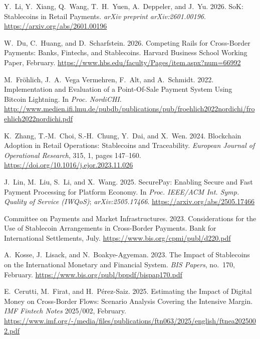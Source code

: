 \documentclass[12pt,a4paper]{report}
\begin{document}
{\begin{enumerate}[label={[\arabic*]}]
\item Y.~Li, Y.~Xiang, Q.~Wang, T.~H.~Yuen, A.~Deppeler, and J.~Yu. 2026. SoK: Stablecoins in Retail Payments. \emph{arXiv preprint arXiv:2601.00196}. \url{https://arxiv.org/abs/2601.00196}

\item W.~Du, C.~Huang, and D.~Scharfstein. 2026. Competing Rails for Cross-Border Payments: Banks, Fintechs, and Stablecoins. Harvard Business School Working Paper, February. \url{https://www.hbs.edu/faculty/Pages/item.aspx?num=66992}

\item M.~Fr\"{o}hlich, J.~A.~Vega Vermehren, F.~Alt, and A.~Schmidt. 2022. Implementation and Evaluation of a Point-Of-Sale Payment System Using Bitcoin Lightning. In \emph{Proc. NordiCHI}. \url{http://www.medien.ifi.lmu.de/pubdb/publications/pub/froehlich2022nordichi/froehlich2022nordichi.pdf}

\item K.~Zhang, T.-M.~Choi, S.-H.~Chung, Y.~Dai, and X.~Wen. 2024. Blockchain Adoption in Retail Operations: Stablecoins and Traceability. \emph{European Journal of Operational Research}, 315, 1, pages 147--160. \url{https://doi.org/10.1016/j.ejor.2023.11.026}

\item J.~Lin, M.~Liu, S.~Li, and X.~Wang. 2025. SecurePay: Enabling Secure and Fast Payment Processing for Platform Economy. In \emph{Proc. IEEE/ACM Int. Symp. Quality of Service (IWQoS)}; \emph{arXiv:2505.17466}. \url{https://arxiv.org/abs/2505.17466}

\item Committee on Payments and Market Infrastructures. 2023. Considerations for the Use of Stablecoin Arrangements in Cross-Border Payments. Bank for International Settlements, July. \url{https://www.bis.org/cpmi/publ/d220.pdf}

\item A.~Kosse, J.~Lisack, and N.~Boakye-Agyeman. 2023. The Impact of Stablecoins on the International Monetary and Financial System. \emph{BIS Papers}, no.~170, February. \url{https://www.bis.org/publ/bppdf/bispap170.pdf}

\item E.~Cerutti, M.~Firat, and H.~P\'{e}rez-Saiz. 2025. Estimating the Impact of Digital Money on Cross-Border Flows: Scenario Analysis Covering the Intensive Margin. \emph{IMF Fintech Notes} 2025/002, February. \url{https://www.imf.org/-/media/files/publications/ftn063/2025/english/ftnea2025002.pdf}


\end{enumerate}}
\end{document}
